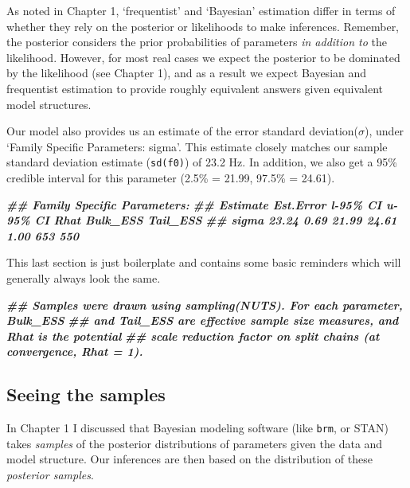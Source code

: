 \documentclass[
]{book}
\newenvironment{Shaded}{\begin{snugshade}}{\end{snugshade}}
\newcommand{\DocumentationTok}[1]{\textcolor[rgb]{0.56,0.35,0.01}{\textbf{\textit{#1}}}}
\begin{document}
As noted in Chapter 1, `frequentist' and `Bayesian' estimation differ in terms of whether they rely on the posterior or likelihoods to make inferences. Remember, the posterior considers the prior probabilities of parameters \emph{in addition to} the likelihood. However, for most real cases we expect the posterior to be dominated by the likelihood (see Chapter 1), and as a result we expect Bayesian and frequentist estimation to provide roughly equivalent answers given equivalent model structures.

Our model also provides us an estimate of the error standard deviation(\(\sigma\)), under `Family Specific Parameters: sigma'. This estimate closely matches our sample standard deviation estimate (\texttt{sd(f0)}) of 23.2 Hz. In addition, we also get a 95\% credible interval for this parameter (2.5\% = 21.99, 97.5\% = 24.61).

\begin{Shaded}
\begin{Highlighting}[]
\DocumentationTok{\#\# Family Specific Parameters: }
\DocumentationTok{\#\#       Estimate Est.Error l{-}95\% CI u{-}95\% CI Rhat Bulk\_ESS Tail\_ESS}
\DocumentationTok{\#\# sigma    23.24      0.69    21.99    24.61 1.00      653      550}
\end{Highlighting}
\end{Shaded}

This last section is just boilerplate and contains some basic reminders which will generally always look the same.

\begin{Shaded}
\begin{Highlighting}[]
\DocumentationTok{\#\# Samples were drawn using sampling(NUTS). For each parameter, Bulk\_ESS}
\DocumentationTok{\#\# and Tail\_ESS are effective sample size measures, and Rhat is the potential}
\DocumentationTok{\#\# scale reduction factor on split chains (at convergence, Rhat = 1).}
\end{Highlighting}
\end{Shaded}

\hypertarget{seeing-the-samples}{%
\subsection{Seeing the samples}\label{seeing-the-samples}}

In Chapter 1 I discussed that Bayesian modeling software (like \texttt{brm}, or STAN) takes \emph{samples} of the posterior distributions of parameters given the data and model structure. Our inferences are then based on the distribution of these \emph{posterior samples}.
\end{document}
